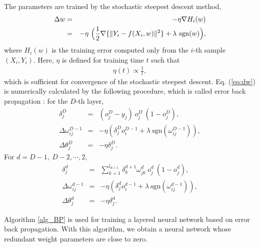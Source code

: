 \documentclass[12pt]{article} %
\begin{document}
The parameters are trained by the stochastic steepest descent method, 
\begin{eqnarray}
  \Delta w &=& -\eta \nabla H_i (w)\nonumber \\
  &=& -\eta \ \Bigl(\frac{1}{2}\nabla \{\|Y_i-f(X_i,w)\|^2\}+\lambda \ \mathrm{sgn}(w)\Bigr),
  \label{eq:dw}
\end{eqnarray}
where $H_i (w)$ is the training error computed only from the $i$-th sample $(X_i, Y_i)$. 
Here, $\eta$ is defined for training time $t$ such that
\begin{eqnarray*}
  \eta(t)\propto \frac{1}{t},
\end{eqnarray*}
which is sufficient for convergence of the stochastic steepest descent. 
Eq. (\ref{eq:dw}) is numerically calculated by the following procedure, which is called error back propagation \cite{Werbos1974,Rumelhart1986}: for the $D$-th layer, 
\begin{eqnarray*}
  \delta^{D}_j &=& (o^{D}_j-y_j)\ o^{D}_j\ (1-o^{D}_j),\\
  \Delta \omega^{D-1}_{ij} &=& -\eta (\delta^{D}_j o^{D-1}_i+\lambda \ \mathrm{sgn}(\omega^{D-1}_{ij})),\\
  \Delta \theta^D_j &=& -\eta \delta^{D}_j.
\end{eqnarray*}
For $d=D-1,\ D-2,\cdots, 2$,
\begin{eqnarray*}
  \delta^d_j &=& \sum_{k=1}^{l_{d+1}} \delta^{d+1}_k \omega^d_{jk}\ o^d_j\ (1-o^d_j),\\
  \Delta \omega^{d-1}_{ij} &=& -\eta (\delta^d_j o^{d-1}_i+\lambda \ \mathrm{sgn}(\omega^{d-1}_{ij})),\\
  \Delta \theta^d_j &=& -\eta \delta^d_j.
\end{eqnarray*}

Algorithm \ref{alg_BP} is used for training a layered neural network based on error back propagation. 
With this algorithm, we obtain a neural network whose redundant weight parameters are close to zero. 
\end{document}
